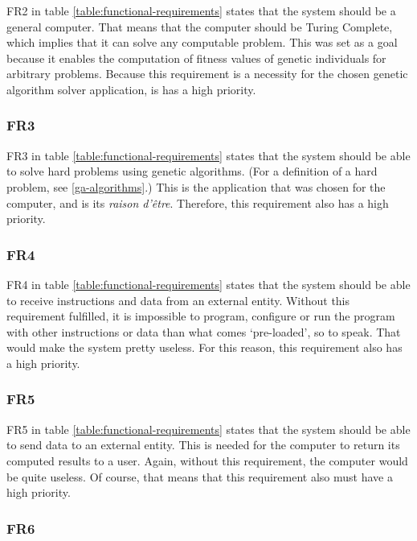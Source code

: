  FR2 in table \vref{table:functional-requirements} states that the system should be a general computer.
 That means that the computer should be Turing Complete, which implies that it can solve any computable problem.
 This was set as a goal because it enables the computation of fitness values of genetic individuals for arbitrary problems. 
 Because this requirement is a necessity for the chosen genetic algorithm solver application, is has a high priority.

\subsubsection{FR3}

FR3 in table \vref{table:functional-requirements} states that the system should be able to solve hard problems using genetic algorithms.
(For a definition of a hard problem, see \vref{ga-algorithms}.)
This is the application that was chosen for the computer, and is its \textit{raison d'être}. 
Therefore, this requirement also has a high priority.

\subsubsection{FR4}

FR4 in table \vref{table:functional-requirements} states that the system should be able to receive instructions and data from an external entity.
Without this requirement fulfilled, it is impossible to program, configure or run the program with other instructions or data than what comes `pre-loaded', so to speak.
That would make the system pretty useless.
For this reason, this requirement also has a high priority.

\subsubsection{FR5}

FR5 in table \vref{table:functional-requirements} states that the system should be able to send data to an external entity.
This is needed for the computer to return its computed results to a user.
Again, without this requirement, the computer would be quite useless.
Of course, that means that this requirement also must have a high priority.

\subsubsection{FR6}

